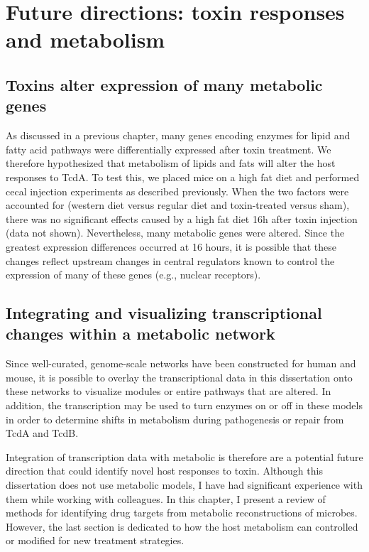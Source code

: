 
\chapter{ Future directions: toxin responses and metabolism }\label{chapter:trends}

\section{Toxins alter expression of many metabolic genes}
As discussed in a previous chapter, many genes encoding enzymes
for lipid and fatty acid pathways were differentially expressed
after toxin treatment. We therefore hypothesized that metabolism
of lipids and fats will alter the host responses to TcdA.
To test this, we placed mice on a high fat diet and performed
cecal injection experiments as described previously.
When the two factors were accounted for (western diet versus regular diet and
toxin-treated versus sham), there was no significant effects
caused by a high fat diet 16h after toxin injection (data not shown).
Nevertheless, many metabolic genes were altered. 
Since the greatest expression differences
occurred at 16 hours, it is possible that these changes
reflect upstream changes in central regulators known to
control the expression of many of these genes (e.g., nuclear receptors).

\section{Integrating and visualizing transcriptional changes within a metabolic network}
Since well-curated, genome-scale networks have been
constructed for human and mouse, it is possible to overlay
the transcriptional data in this dissertation onto these networks
to visualize modules or entire pathways that are altered.
In addition, the transcription may be used to turn enzymes on or
off in these models in order to determine shifts in metabolism
during pathogenesis or repair from TcdA and TcdB. 

Integration of transcription data with metabolic 
is therefore are a potential future direction that could
identify novel host responses to toxin. Although this dissertation
does not use metabolic models, I have had significant experience
with them while working with colleagues. In this chapter,
I present a review of methods for identifying drug targets
from metabolic reconstructions of microbes. However, the last
section is dedicated to how the host metabolism can controlled
or modified for new treatment strategies.

